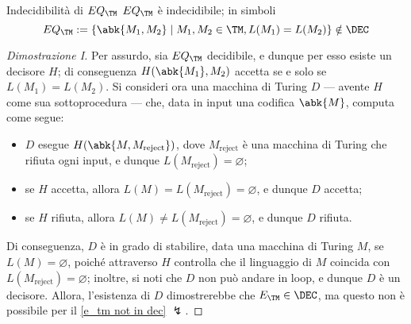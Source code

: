 \documentclass[a4paper, 12pt]{report}
\begin{document}
    \begin{framedthm}{Indecidibilità di $EQ_\TM$}
        $EQ_\TM$ è indecidibile; in simboli $$EQ_\TM := \{\abk{M_1, M_2} \mid M_1, M_2 \in \TM, L(M_1) = L(M_2)\} \notin \DEC$$
    \end{framedthm}

    \begin{proof}[Dimostrazione I]
        Per assurdo, sia $EQ_\TM$ decidibile, e dunque per esso esiste un decisore $H$; di conseguenza $H(\abk{M_1}, {M_2})$ accetta se e solo se $L(M_1)= L(M_2)$. Si consideri ora una macchina di Turing $D$ --- avente $H$ come sua sottoprocedura --- che, data in input una codifica $\abk{M}$, computa come segue:

        \begin{itemize}
            \item $D$ esegue $H(\abk{M, M_\mathrm{reject}})$, dove $M_\mathrm{reject }$ è una macchina di Turing che rifiuta ogni input, e dunque $L(M_\mathrm{reject}) = \varnothing$;
            \item se $H$ accetta, allora $L(M) = L(M_\mathrm{reject}) = \varnothing$, e dunque $D$ accetta;
            \item se $H$ rifiuta, allora $L(M) \neq L(M_\mathrm{reject}) = \varnothing$, e dunque $D$ rifiuta.
        \end{itemize}

        Di conseguenza, $D$ è in grado di stabilire, data una macchina di Turing $M$, se $L(M) = \varnothing$, poiché attraverso $H$ controlla che il linguaggio di $M$ coincida con $L(M_\mathrm{reject})= \varnothing$; inoltre, si noti che $D$ non può andare in loop, e dunque $D$ è un decisore. Allora, l'esistenza di $D$ dimostrerebbe che $E_\TM \in \DEC$, ma questo non è possibile per il \cref{e_tm not in dec} $\lightning$.
    \end{proof}
\end{document}
